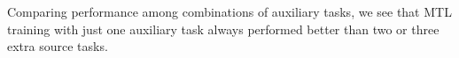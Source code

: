 \documentclass[a4paper]{article}
\begin{document}
Comparing performance among combinations of auxiliary tasks, we see that MTL training with just one auxiliary task always performed better than two or three extra source tasks.



\end{document}
